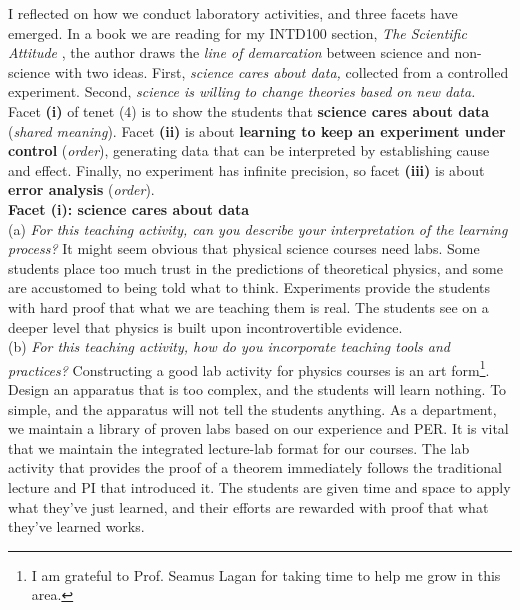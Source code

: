 \documentclass[../../../main.tex]{subfiles}
\begin{document}
I reflected on how we conduct laboratory activities, and three facets have emerged.  In a book we are reading for my INTD100 section, \textit{The Scientific Attitude} \cite{scientific_attitude}, the author draws the \textit{line of demarcation} between science and non-science with two ideas.  First, \textit{science cares about data,} collected from a controlled experiment.  Second, \textit{science is willing to change theories based on new data.}  Facet \textbf{(i)} of tenet (4) is to show the students that \textbf{science cares about data} (\textit{shared meaning}).  Facet \textbf{(ii)} is about \textbf{learning to keep an experiment under control} (\textit{order}), generating data that can be interpreted by establishing cause and effect.  Finally, no experiment has infinite precision, so facet \textbf{(iii)} is about \textbf{error analysis} (\textit{order}).
\\
\vspace{0.15cm}
\textbf{Facet (i): science cares about data}
\\
\vspace{0.15cm}
(a) \textit{For this teaching activity, can you describe your interpretation of the learning process?}  It might seem obvious that physical science courses need labs.  Some students place too much trust in the predictions of theoretical physics, and some are accustomed to being told what to think.  Experiments provide the students with hard proof that what we are teaching them is real.  The students see on a deeper level that physics is built upon incontrovertible evidence.
\\
\vspace{0.15cm}
(b) \textit{For this teaching activity, how do you incorporate teaching tools and practices?}  Constructing a good lab activity for physics courses is an art form\footnote{I am grateful to Prof. Seamus Lagan for taking time to help me grow in this area.}.  Design an apparatus that is too complex, and the students will learn nothing.  To simple, and the apparatus will not tell the students anything.  As a department, we maintain a library of proven labs based on our experience and PER.  It is vital that we maintain the integrated lecture-lab format for our courses.  The lab activity that provides the proof of a theorem immediately follows the traditional lecture and PI that introduced it.  The students are given time and space to apply what they've just learned, and their efforts are rewarded with proof that what they've learned works.
\\
\vspace{0.15cm}
\end{document}
